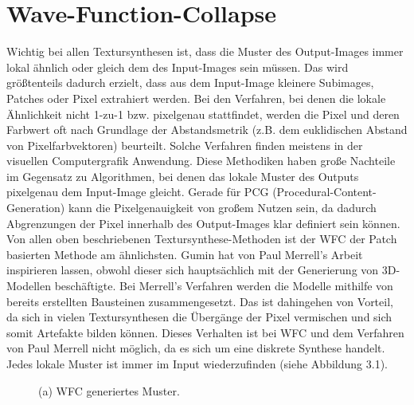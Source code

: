\documentclass[12pt, a4paper,twoside,openright]{report} %
\begin{document}
\chapter{Wave-Function-Collapse}

Wichtig bei allen Textursynthesen ist,
dass die Muster des Output-Images immer lokal ähnlich oder gleich dem des Input-Images sein müssen.
Das wird größtenteils dadurch erzielt, dass aus dem Input-Image kleinere Subimages, Patches oder Pixel extrahiert werden.
Bei den Verfahren, bei denen die lokale Ähnlichkeit nicht 1-zu-1 bzw. pixelgenau stattfindet,
werden die Pixel und deren Farbwert oft nach Grundlage der Abstandsmetrik {(z.B. dem euklidischen Abstand von Pixelfarbvektoren)} beurteilt.
Solche Verfahren finden meistens in der visuellen Computergrafik Anwendung.
Diese Methodiken haben große Nachteile im Gegensatz zu Algorithmen, bei denen das lokale Muster des Outputs pixelgenau dem Input-Image gleicht.
Gerade für PCG {(Procedural-Content-Generation)} kann die Pixelgenauigkeit von großem Nutzen sein, da dadurch Abgrenzungen der Pixel innerhalb des Output-Images klar definiert sein können.
\cite{Karth2017WaveFunctionCollapseIC}
Von allen oben beschriebenen Textursynthese-Methoden ist der WFC der Patch basierten Methode am ähnlichsten.
\newline
Gumin hat von Paul Merrell's Arbeit inspirieren lassen, obwohl dieser sich hauptsächlich mit der Generierung von 3D-Modellen beschäftigte.
Bei Merrell's Verfahren werden die Modelle mithilfe von bereits erstellten Bausteinen zusammengesetzt.
Das ist dahingehen von Vorteil, da sich in vielen Textursynthesen die Übergänge der Pixel vermischen und sich somit Artefakte bilden können.
Dieses Verhalten ist bei WFC und dem Verfahren von Paul Merrell nicht möglich, da es sich um eine diskrete Synthese handelt.
Jedes lokale Muster ist immer im Input wiederzufinden {(siehe Abbildung 3.1)}. \cite{Karth2017WaveFunctionCollapseIC, merrell2009model, Gumin_Wave_Function_Collapse_2016}

\begin{figure}[H]
    \centering
    \caption{(a) WFC generiertes Muster.}%
\end{figure}
\end{document}

